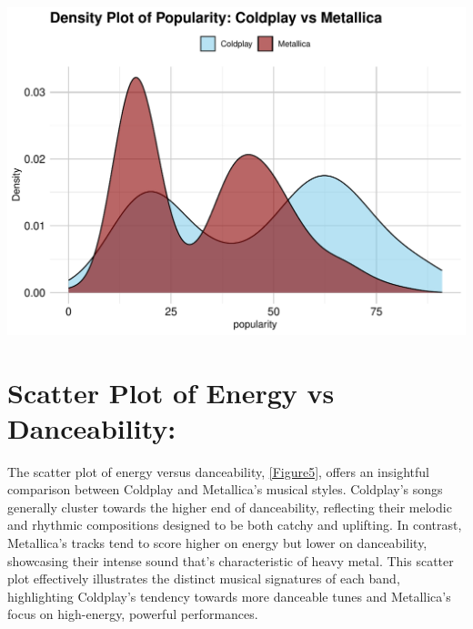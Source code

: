 \documentclass[12pt,preprint, authoryear]{elsarticle}
\let\origfigure\figure
\let\endorigfigure\endfigure
\renewenvironment{figure}[1][2] {
    \expandafter\origfigure\expandafter[H]
} {
    \endorigfigure
}
\numberwithin{equation}{section}
\numberwithin{figure}{section}
\numberwithin{table}{section}
\begin{document}
\begin{figure}

{\centering \includegraphics{README_files/figure-latex/unnamed-chunk-4-1} 

}

\caption{Density Plot of Popularity\label{Figure4}}\label{fig:unnamed-chunk-4}
\end{figure}

\hypertarget{scatter-plot-of-energy-vs-danceability}{%
\section{Scatter Plot of Energy vs
Danceability:}\label{scatter-plot-of-energy-vs-danceability}}

The scatter plot of energy versus danceability, \ref{Figure5}, offers an
insightful comparison between Coldplay and Metallica's musical styles.
Coldplay's songs generally cluster towards the higher end of
danceability, reflecting their melodic and rhythmic compositions
designed to be both catchy and uplifting. In contrast, Metallica's
tracks tend to score higher on energy but lower on danceability,
showcasing their intense sound that's characteristic of heavy metal.
This scatter plot effectively illustrates the distinct musical
signatures of each band, highlighting Coldplay's tendency towards more
danceable tunes and Metallica's focus on high-energy, powerful
performances.
\end{document}
